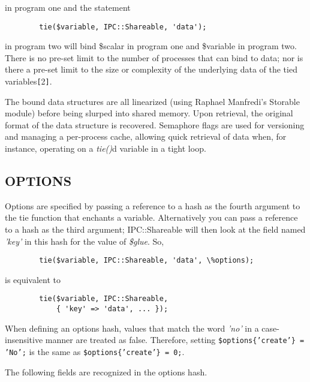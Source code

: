 in program one and the statement
\begin{verbatim}
        tie($variable, IPC::Shareable, 'data');
\end{verbatim}

in program two will bind \$scalar in program one and \$variable in
program two.  There is no pre-set limit to the number of processes
that can bind to data; nor is there a pre-set limit to the size or
complexity of the underlying data of the tied variables{\tt [}2{\tt ]}.

The bound data structures are all linearized (using Raphael Manfredi's
Storable module) before being slurped into shared memory.  Upon
retrieval, the original format of the data structure is recovered.
Semaphore flags are used for versioning and managing a per-process
cache, allowing quick retrieval of data when, for instance, operating
on a {\em tie()\/}d variable in a tight loop.

\subsection*{OPTIONS}%

Options are specified by passing a reference to a hash as the fourth
argument to the tie function that enchants a variable.  Alternatively
you can pass a reference to a hash as the third argument;
IPC::Shareable will then look at the field named {\em 'key'\/} in this hash
for the value of {\em \$glue\/}.  So,
\begin{verbatim}
        tie($variable, IPC::Shareable, 'data', \%options);
\end{verbatim}

is equivalent to
\begin{verbatim}
        tie($variable, IPC::Shareable,
            { 'key' => 'data', ... });
\end{verbatim}

When defining an options hash, values that match the word {\em 'no'\/} in a
case-insensitive manner are treated as false.  Therefore, setting
{\tt \$options\{'create'\} = 'No';} is the same as {\tt \$options\{'create'\} =
0;}.

The following fields are recognized in the options hash.

